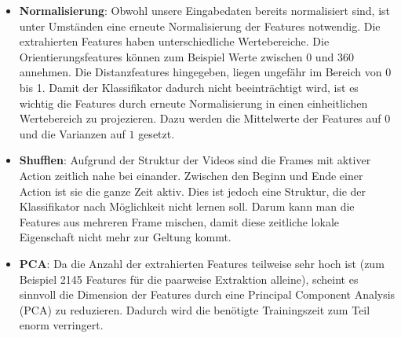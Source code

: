 \begin{itemize}

  \item \textbf{Normalisierung}: Obwohl unsere Eingabedaten bereits normalisiert sind, ist unter Umständen eine erneute Normalisierung der Features notwendig. Die extrahierten
        Features haben unterschiedliche Wertebereiche. Die Orientierungsfeatures können zum Beispiel Werte zwischen 0 und 360 annehmen. Die Distanzfeatures hingegeben, liegen
        ungefähr im Bereich von 0 bis 1. Damit der Klassifikator dadurch nicht beeinträchtigt wird, ist es wichtig die Features durch erneute Normalisierung in einen einheitlichen
        Wertebereich zu projezieren. Dazu werden die Mittelwerte der Features auf $0$ und die Varianzen auf $1$ gesetzt.

  \item \textbf{Shufflen}: 
    Aufgrund der Struktur der Videos sind die Frames mit aktiver Action zeitlich nahe bei einander. Zwischen den Beginn und Ende einer Action ist sie die ganze Zeit aktiv.
    Dies ist jedoch eine Struktur, die der Klassifikator nach Möglichkeit nicht lernen soll. Darum kann man die Features aus mehreren Frame mischen, damit diese zeitliche lokale Eigenschaft nicht mehr zur Geltung kommt.

  \item \textbf{PCA}: Da die Anzahl der extrahierten Features teilweise sehr hoch ist (zum Beispiel 2145 Features für die paarweise Extraktion alleine), scheint es  sinnvoll die Dimension der Features durch eine Principal Component Analysis (PCA) zu reduzieren. Dadurch wird die benötigte Trainingszeit zum Teil enorm verringert. 
\end{itemize}

